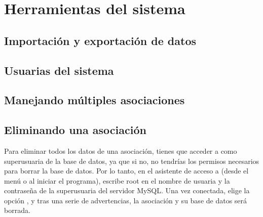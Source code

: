 \chapter{Herramientas del sistema}
\section{Importación y exportación de datos}
\section{Usuarias del sistema}
\section{Manejando múltiples asociaciones}
\section{Eliminando una asociación}
Para eliminar todos los datos de una asociación, tienes que acceder a
\appname como superusuaria de la base de datos, ya que si no, no
tendrías los permisos necesarios para borrar la base de datos. Por lo
tanto, en el asistente de acceso a \appname (desde el menú
 o al
iniciar el programa), escribe root en el nombre de usuaria y la
contraseña de la superusuaria del servidor MySQL. Una vez conectada,
elige la opción , y tras una serie de advertencias, la asociación y su
base de datos será borrada.
